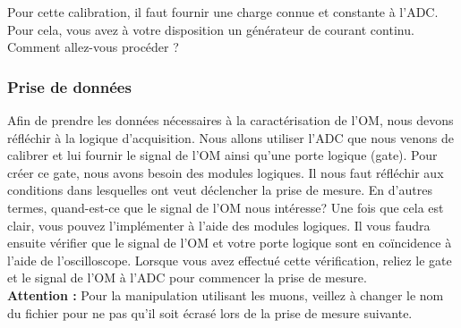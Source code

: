Pour cette calibration, il faut fournir une charge connue et constante à l'ADC. Pour cela, vous avez à votre disposition un générateur de courant continu. Comment allez-vous procéder ? 


\subsubsection{Prise de données}

Afin de prendre les données nécessaires à la caractérisation de l'OM, nous devons réfléchir à la logique d'acquisition. Nous allons utiliser l'ADC que nous venons de calibrer et lui fournir le signal de l'OM ainsi qu'une porte logique (gate). Pour créer ce gate, nous avons besoin des modules logiques. Il nous faut réfléchir aux conditions dans lesquelles ont veut déclencher la prise de mesure. En d'autres termes, quand-est-ce que le signal de l'OM nous intéresse? Une fois que cela est clair, vous pouvez l'implémenter à l'aide des modules logiques. Il vous faudra ensuite vérifier que le signal de l'OM et votre porte logique sont en coïncidence à l'aide de l'oscilloscope. Lorsque vous avez effectué cette vérification, reliez le gate et le signal de l'OM à l'ADC pour commencer la prise de mesure.\\

\textbf{Attention :} Pour la manipulation utilisant les muons, veillez à changer le nom du fichier pour ne pas qu'il soit écrasé lors de la prise de mesure suivante.


